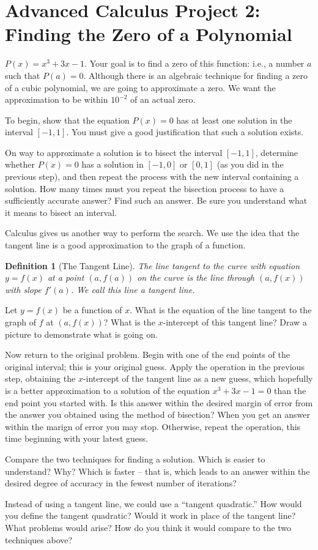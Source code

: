 \documentclass
[justified,nohyper]
{tufte-handout}
\theoremstyle{mydef}
\newtheorem{definition}{Definition}
\begin{document}
\section{Advanced Calculus Project 2: Finding the Zero of a Polynomial}

 $P(x)=x^3+3x-1$. Your goal is to find a zero of this function: i.e., a number $a$ such that $P(a)=0$. Although there is an algebraic technique for finding a zero of a cubic polynomial, we are going to approximate a zero. We want the approximation to be within $10^{-2}$ of an actual zero.

To begin, show that the equation $P(x)=0$ has at least one solution in the interval $[-1,1]$. You must give a good justification that such a solution exists.

On way to approximate a solution is to bisect the interval $[-1,1]$, determine whether $P(x)=0$ has a solution in $[-1,0]$ or $[0,1]$ (as you did in the previous step), and then repeat the process with the new interval containing a solution. How many times must you repeat the bisection process to have a sufficiently accurate answer? Find such an answer. Be sure you understand what it means to bisect an interval.

Calculus gives us another way to perform the search. We use the idea that the tangent line is a good approximation to the graph of a function.

\begin{definition}[The Tangent Line]
The line tangent to the curve with equation $y=f(x)$ at a point $\left(a,f(a)\right)$ on the curve is the line through $\left(a,f(x)\right)$ with slope $f'(a)$. We call this line a tangent line.
\end{definition}

Let $y=f(x)$ be a function of $x$. What is the equation of the line tangent to the graph of $f$ at $\left(a,f(x)\right)$? What is the $x$-intercept of this tangent line? Draw a picture to demonstrate what is going on.

Now return to the original problem. Begin with one of the end points of the original interval; this is your original guess. Apply the operation in the previous step, obtaining the $x$-intercept of the tangent line as a new guess, which hopefully is a better approximation to a solution of the equation $x^3+3x-1=0$ than the end point you started with. Is this answer within the desired margin of error from the answer you obtained using the method of bisection? When you get an answer within the marign of error you may stop. Otherwise, repeat the operation, this time beginning with your latest guess.

Compare the two techniques for finding a solution. Which is easier to understand? Why? Which is faster -- that is, which leads to an answer within the desired degree of accuracy in the fewest number of iterations?

Instead of using a tangent line, we could use a ``tangent quadratic.'' How would you define the tangent quadratic? Would it work in place of the tangent line? What problems would arise? How do you think it would compare to the two techniques above? 
\end{document}
